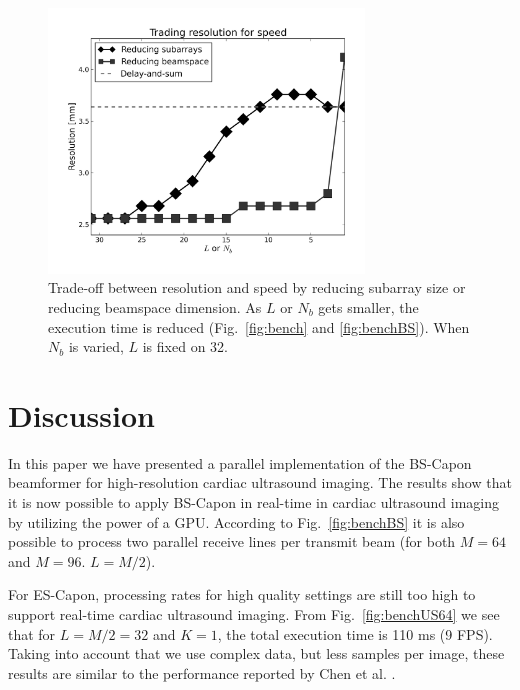 \documentclass[journal]{IEEEtran}
\begin{document}
\begin{figure}
\centering
\includegraphics[width=3.3in]{gfx/speed_res_trade.png}
\caption{Trade-off between resolution and speed by reducing subarray size or reducing beamspace dimension. As $L$ or $N_b$ gets smaller, the execution time is reduced (Fig.\ \ref{fig:bench} and \ref{fig:benchBS}). When $N_b$ is varied, $L$ is fixed on 32.}
\label{fig:speed_res_trade}
\end{figure}

\section{Discussion}\label{sec:dis}
In this paper we have presented a parallel implementation of the BS-Capon beamformer for high-resolution cardiac ultrasound imaging. The results show that it is now possible to apply BS-Capon in real-time in cardiac ultrasound imaging by utilizing the power of a GPU. According to Fig.\ \ref{fig:benchBS} it is also possible to process two parallel receive lines per transmit beam (for both $M=64$ and $M=96$. $L=M/2$). %

For ES-Capon, processing rates for high quality settings are still too high to support real-time cardiac ultrasound imaging. From Fig.\ \ref{fig:benchUS64} we see that for $L = M/2 = 32$ and $K=1$, the total execution time is 110 ms (9 FPS). Taking into account that we use complex data, but less samples per image, these results are similar to the performance reported by Chen et al. \cite{Chen2011}.
\end{document}
